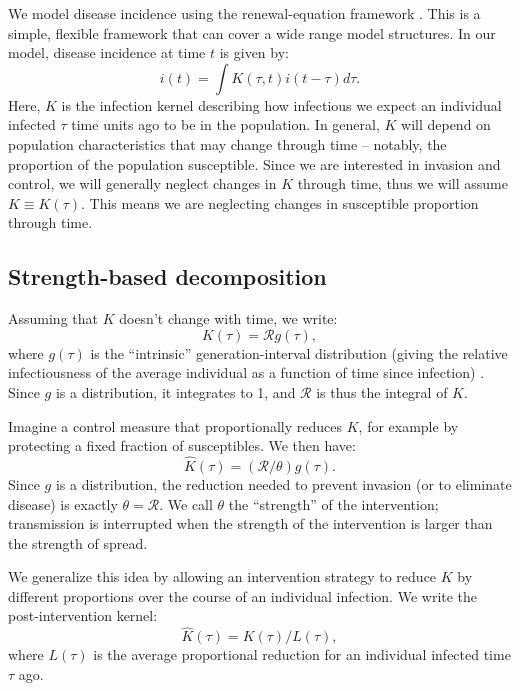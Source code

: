 \documentclass{article}\usepackage[]{graphicx}\usepackage[]{color}
\newcommand{\RR}{\ensuremath{{\mathcal R}}}
\newcommand{\eqlab}[1]{\label{eq:#1}}
\begin{document}
We model disease incidence using the renewal-equation framework \cite{SeeChamp?}. 
This is a simple, flexible framework that can cover a wide range model structures.
In our model, disease incidence at time $t$ is given by:
\begin{equation}
i(t) = \int K(\tau, t) i(t-\tau) d\tau.
\end{equation}
Here, $K$ is the infection kernel describing how infectious we expect an individual infected $\tau$ time units ago to be in the population.
In general, $K$ will depend on population characteristics that may change through time -- notably, the proportion of the population susceptible.
Since we are interested in invasion and control, we will generally neglect changes in $K$ through time, thus we will assume $K\equiv K(\tau)$. 
This means we are neglecting changes in susceptible proportion through time.

\subsection{Strength-based decomposition}

Assuming that $K$ doesn't change with time, we write:
\begin{equation}
	K(\tau) = \RR g(\tau),
	\eqlab{speed}
\end{equation}
where $g(\tau)$ is the ``intrinsic'' generation-interval distribution (giving the relative infectiousness of the average individual as a function of time since infection) \cite{Champ}. Since $g$ is a distribution, it integrates to 1, and $\RR$ is thus the integral of $K$.

Imagine a control measure that proportionally reduces $K$, for example by protecting a fixed fraction of susceptibles. We then have:
\begin{equation}
	\hat K(\tau) = (\RR/\theta) g(\tau).
\end{equation}
Since $g$ is a distribution, the reduction needed to prevent invasion (or to eliminate disease)  is exactly $\theta=\RR$. We call $\theta$ the ``strength'' of the intervention; transmission is interrupted when the strength of the intervention is larger than the strength of spread.

We generalize this idea by allowing an intervention strategy to reduce $K$ by different proportions over the course of an individual infection. We write the post-intervention kernel:
\begin{equation}
	\hat K(\tau) = K(\tau)/L(\tau), 
\end{equation}
where $L(\tau)$ is the average proportional reduction for an individual infected time $\tau$ ago.
\end{document}
